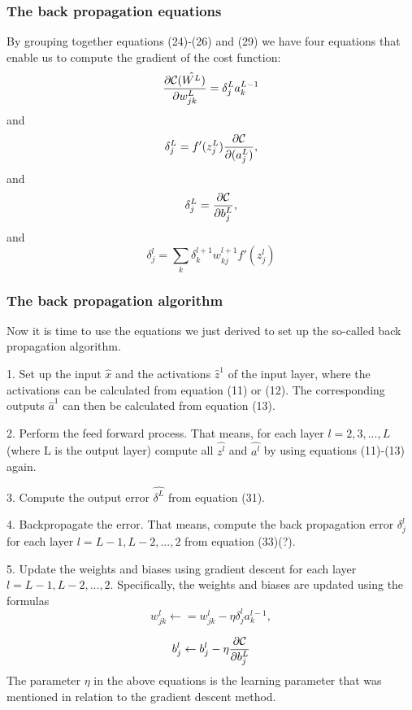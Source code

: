 \documentclass[a4paper,12pt]{article}
\begin{document}
\subsubsection{The back propagation equations}
By grouping together equations (24)-(26) and (29) we have four equations that enable us to compute the gradient of the cost function:
\begin{equation}
    \frac{\partial{\cal C}(\hat{W^L})}{\partial w_{jk}^L}  =  \delta_j^La_k^{L-1}
\end{equation}
and
\begin{equation}
\delta_j^L = f'(z_j^L)\frac{\partial {\cal C}}{\partial (a_j^L)},
\end{equation}
and
\begin{equation}
\delta_j^L = \frac{\partial {\cal C}}{\partial b_j^L},
\end{equation}
and
\begin{equation}
    \delta_j^l =\sum_k \delta_k^{l+1}w_{kj}^{l+1}f'(z_j^l)
\end{equation}

\subsubsection{The back propagation algorithm}
Now it is time to use the equations we just derived to set up the so-called back propagation algorithm.\newline

1. Set up the input $\hat{x}$ and the activations $\hat{z}^1$ of the input layer, where the activations can be calculated from equation (11) or (12). The corresponding outputs $\hat{a}^1$ can then be calculated from equation (13).\newline 

2. Perform the feed forward process. That means, for each layer $l = 2, 3,..., L$ (where L is the output layer) compute all $\hat{z^l}$ and $\hat{a^l}$ by using equations (11)-(13) again.\newline

3. Compute the output error $\hat{\delta^L}$ from equation (31).\newline

4. Backpropagate the error. That means, compute the back propagation error $\delta_j^l$ for each layer $l = L-1, L-2,..., 2$ from equation (33)(?).\newline

5. Update the weights and biases using gradient descent for each layer $l=L-1, L-2,..., 2$. Specifically, the weights and biases are updated using the formulas
\begin{equation}
    w_{jk}^l\leftarrow  = w_{jk}^l- \eta \delta_j^la_k^{l-1},
\end{equation}

\begin{equation}
    b_j^l \leftarrow b_j^l-\eta \frac{\partial {\cal C}}{\partial b_j^L}
\end{equation}
The parameter $\eta$ in the above equations is the learning parameter that was mentioned in relation to the gradient descent method.
\end{document}
